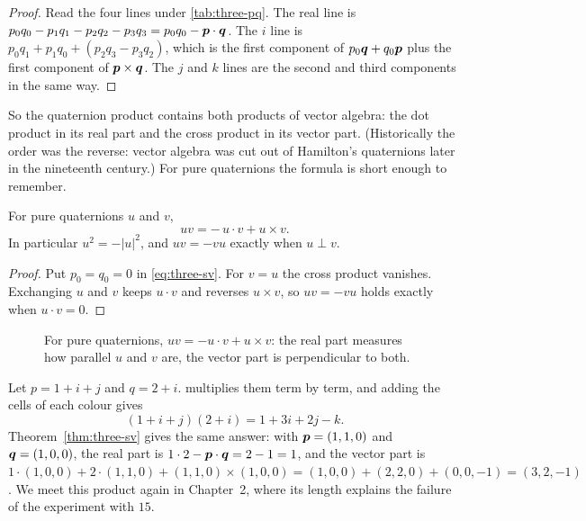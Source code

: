 \begin{proof}
Read the four lines under \cref{tab:three-pq}. The real line is $p_0q_0-p_1q_1-p_2q_2-p_3q_3=p_0q_0-\bm{p}\cdot\bm{q}$. The $i$ line is $p_0q_1+p_1q_0+(p_2q_3-p_3q_2)$, which is the first component of $p_0\bm{q}+q_0\bm{p}$ plus the first component of $\bm{p}\times\bm{q}$. The $j$ and $k$ lines are the second and third components in the same way.
\end{proof}

So the quaternion product contains both products of vector algebra: the dot product in its real part and the cross product in its vector part. (Historically the order was the reverse: vector algebra was cut out of Hamilton's quaternions later in the nineteenth century.) For pure quaternions the formula is short enough to remember.

\begin{corollary}\label{cor:three-pure}
For pure quaternions $u$ and $v$,
\begin{equation}\label{eq:three-uv}
  uv=-\,u\cdot v+u\times v .
\end{equation}
In particular $u^2=-|u|^2$, and $uv=-vu$ exactly when $u\perp v$.
\end{corollary}

\begin{proof}
Put $p_0=q_0=0$ in \eqref{eq:three-sv}. For $v=u$ the cross product vanishes. Exchanging $u$ and $v$ keeps $u\cdot v$ and reverses $u\times v$, so $uv=-vu$ holds exactly when $u\cdot v=0$.
\end{proof}


\begin{figure}[htbp]
  \centering
  \caption{For pure quaternions, $uv=-u\cdot v+u\times v$: the real part measures how parallel $u$ and $v$ are, the vector part is perpendicular to both.}
  \label{fig:three-cross}
\end{figure}

\begin{example}\label{ex:three-numeric}
Let $p=1+i+j$ and $q=2+i$.  multiplies them term by term, and adding the cells of each colour gives
\[
  (1+i+j)(2+i)=1+3i+2j-k .
\]
Theorem~\ref{thm:three-sv} gives the same answer: with $\bm{p}=(1,1,0)$ and $\bm{q}=(1,0,0)$, the real part is $1\cdot2-\bm{p}\cdot\bm{q}=2-1=1$, and the vector part is $1\cdot(1,0,0)+2\cdot(1,1,0)+(1,1,0)\times(1,0,0)=(1,0,0)+(2,2,0)+(0,0,-1)=(3,2,-1)$. We meet this product again in Chapter~2, where its length explains the failure of the experiment with $15$.
\end{example}

